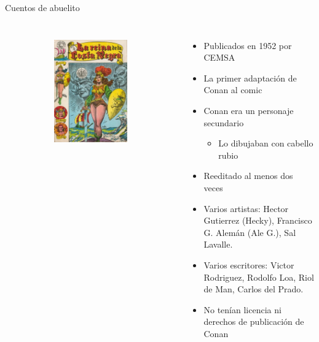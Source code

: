 \begin{frame}{Cuentos de abuelito}
\begin{columns}
\begin{figure}[htb]
\begin{subfigure}[b]{0.35\textwidth}
				\includegraphics[width=\textwidth]{img/abuelitoReprint}
			\end{subfigure}
		\end{figure}
		\begin{itemize}
			\item Publicados en 1952 por CEMSA
			\item La primer adaptación de Conan al comic
			\item Conan era un personaje secundario
			\begin{itemize}
				\item Lo dibujaban con cabello rubio
			\end{itemize}
		    \item Reeditado al menos dos veces
		    \item Varios artistas:  Hector Gutierrez (Hecky), Francisco G. Alemán (Ale G.), Sal Lavalle.
		    \item Varios escritores: Victor Rodriguez, Rodolfo Loa, Riol de Man, Carlos del Prado.
		    \item No tenían licencia ni derechos de publicación de Conan
		\end{itemize}
	\end{columns}
\end{frame}

